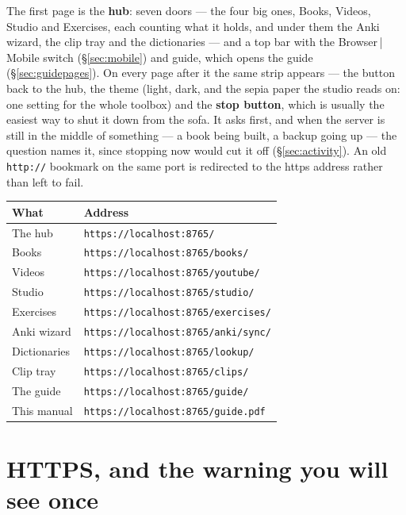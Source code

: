 \documentclass[11pt,oneside]{report}
\newcommand{\pw}[1]{\babelsublr{\mbox{\foreignlanguage{persian}{#1}}}}
\newcommand{\menu}[1]{\textsf{#1}}
\begin{document}
The first page is the \textbf{hub}: seven doors --- the four big ones,
\menu{Books}, \menu{Videos}, \menu{Studio} and \menu{Exercises}, each
counting what it holds, and under them the Anki wizard, the clip tray and
the dictionaries --- and a top bar with the \menu{Browser}\,|\,\menu{Mobile}
switch (\S\ref{sec:mobile}) and \menu{guide}, which opens the guide
(\S\ref{sec:guidepages}). On every page after it the
same strip appears --- the \pw{پ} button back to the hub, the theme (light,
dark, and the sepia paper the studio reads on: one setting for the whole
toolbox) and the \textbf{stop
button}, which is usually the easiest way to shut it down from the sofa. It
asks first, and when the server is still in the middle of something --- a
book being built, a backup going up --- the question names it, since
stopping now would cut it off (\S\ref{sec:activity}). An
old \texttt{http://} bookmark on the same port is redirected to the https
address rather than left to fail.

\begin{center}
\begin{tabular}{@{}ll@{}}
\toprule
\textsf{What} & \textsf{Address} \\
\midrule
The hub     & \texttt{https://localhost:8765/} \\
Books       & \texttt{https://localhost:8765/books/} \\
Videos      & \texttt{https://localhost:8765/youtube/} \\
Studio      & \texttt{https://localhost:8765/studio/} \\
Exercises   & \texttt{https://localhost:8765/exercises/} \\
Anki wizard & \texttt{https://localhost:8765/anki/sync/} \\
Dictionaries & \texttt{https://localhost:8765/lookup/} \\
Clip tray   & \texttt{https://localhost:8765/clips/} \\
The guide   & \texttt{https://localhost:8765/guide/} \\
This manual & \texttt{https://localhost:8765/guide.pdf} \\
\bottomrule
\end{tabular}
\end{center}

\section{HTTPS, and the warning you will see once}
\label{sec:https}
\end{document}
